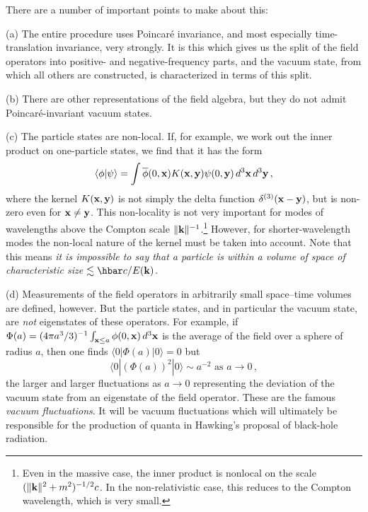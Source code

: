 \documentclass[
%
draft    %
,numberedheadings 
,bibliocites
  ]
  {aipproc}
\begin{document}
There are a number of important points to make about this:


(a) The entire procedure uses Poincar\'e invariance, and most especially time-translation invariance, very strongly.  It is this which gives us the split of the field operators into positive- and negative-frequency parts, and the vacuum state, from which all others are constructed, is characterized in terms of this split.

(b) There are other representations of the field algebra, but they do not admit 
Poincar\'e-invariant vacuum states.  


(c)
The particle states are non-local.  If, for example, we work out the inner product on one-particle states, we find that it has the form
\begin{equation}
  \langle \phi |\psi\rangle =\int {\overline\phi}(0,{\bf x})K({\bf x},{\bf y})\psi (0,{\bf y})\, d^3{\bf x}\, d^3{\bf y}\, ,
\end{equation}
where the kernel $K({\bf x},{\bf y})$ is not simply the delta function $\delta ^{(3)}({\bf x}-{\bf y})$, but is non-zero even for ${\bf x}\not={\bf y}$.  This non-locality is not very important for modes of wavelengths above the Compton scale $\|{\bf k}\| ^{-1}$.\footnote{Even in the massive case, the inner product is nonlocal on the scale $(\| {\bf k}\|^2+m^2)^{-1/2}c$.  In the non-relativistic case, this reduces to the Compton wavelength, which is very small.}  However, for 
shorter-wavelength modes the non-local nature of the kernel must be taken into account.
Note that this means {\em it is impossible to say that a particle is within a volume of space of characteristic size $\lesssim \hbar c/E({\bf k})$.}

(d) Measurements of the field operators in arbitrarily small space--time volumes are defined, however.  But the particle states, and in particular the vacuum state, are {\em not} eigenstates of these operators.  For example, if $\Phi (a) =(4\pi a^3/3)^{-1}\int _{{\bf x}\leq a}\phi (0,{\bf x})\, d^3{\bf x}$ is the average of the field over a sphere of radius $a$, then one finds $\langle 0|\Phi (a)|0\rangle =0$ but
\begin{equation}
\langle 0|(\Phi (a))^2|0\rangle\sim a^{-2}\mbox{  as  }a\to 0\, ,
\end{equation}
the larger and larger fluctuations as $a\to 0$ representing the deviation of the vacuum state from an eigenstate of the field operator.  These are the famous {\em vacuum fluctuations}.
It will be vacuum fluctuations which will ultimately be responsible for the production of quanta in Hawking's proposal of black-hole radiation.
\end{document}
